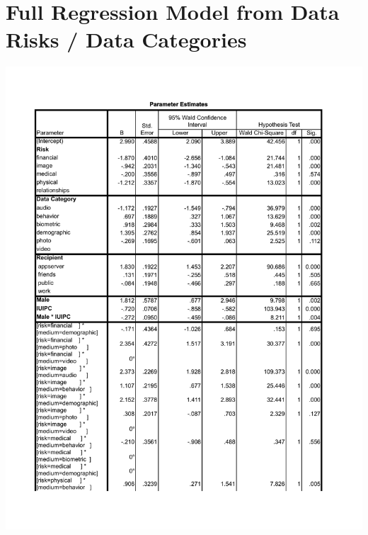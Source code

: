 \section{Full Regression Model from Data Risks / Data Categories}
\label{sec:regression-apx2}
\includegraphics[page=1,scale=0.8]{images/full-model2.pdf}


\twocolumn
